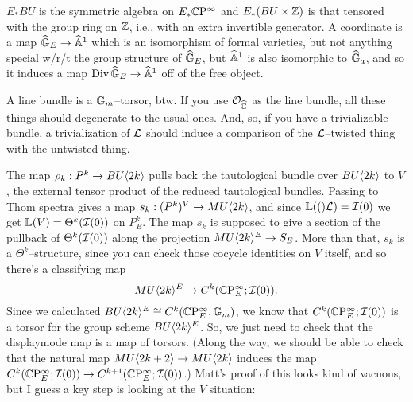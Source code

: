 $E_* BU$ is the symmetric algebra on $E_* \mathbb{C}\mathrm P^\infty$ and $E_* (BU \times \mathbb Z)$ is that tensored with the group ring on $\mathbb Z$, i.e., with an extra invertible generator.  A coordinate is a map $\widehat{\mathbb G}_E \to \widehat{\mathbb{A}}^1$ which is an isomorphism of formal varieties, but not anything special w/r/t the group structure of $\widehat{\mathbb G}_E$, but $\widehat{\mathbb{A}}^1$ is also isomorphic to $\widehat{\mathbb G}_a$, and so it induces a map $\operatorname{Div} \widehat{\mathbb G}_E \to \widehat{\mathbb{A}}^1$ off of the free object.

A line bundle is a $\mathbb G_m$--torsor, btw.  If you use $\mathcal{O}_{\widehat{\mathbb G}}$ as the line bundle, all these things should degenerate to the usual ones.  And, so, if you have a trivializable bundle, a trivialization of $\mathcal{L}$ should induce a comparison of the $\mathcal{L}$--twisted thing with the untwisted thing.

 The map $\rho_k: P^k \to BU\langle2k\rangle$ pulls back the tautological bundle over $BU\langle2k\rangle$ to $V$, the external tensor product of the reduced tautological bundles.  Passing to Thom spectra gives a map $s_k: (P^k)^V \to MU\langle2k\rangle$, and since $\mathbb{L}(()\mathcal{L}) = \mathcal{I}(0)$ we get $\mathbb{L}(V) = \Theta^k(\mathcal{I}(0))$ on $P^k_E$.  The map $s_k$ is supposed to give a section of the pullback of $\Theta^k(\mathcal{I}(0))$ along the projection $MU\langle2k\rangle^E \to S_E$.  More than that, $s_k$ is a $\Theta^k$--structure, since you can check those cocycle identities on $V$ itself, and so there's a classifying map \[MU\langle2k\rangle^E \to C^k(\mathbb{C}\mathrm P^\infty_E; \mathcal{I}(0)).\]  Since we calculated $BU\langle2k\rangle^E \cong C^k(\mathbb{C}\mathrm P^\infty_E, \mathbb G_m)$, we know that $C^k(\mathbb{C}\mathrm P^\infty_E; \mathcal{I}(0))$ is a torsor for the group scheme $BU\langle2k\rangle^E$.  So, we just need to check that the displaymode map is a map of torsors.  (Along the way, we should be able to check that the natural map $MU\langle2k+2\rangle \to MU\langle2k\rangle$ induces the map $C^k(\mathbb{C}\mathrm P^\infty_E; \mathcal{I}(0)) \to C^{k+1}(\mathbb{C}\mathrm P^\infty_E; \mathcal{I}(0))$.)  Matt's proof of this looks kind of vacuous, but I guess a key step is looking at the $V$ situation:
\begin{center}
\end{center}









